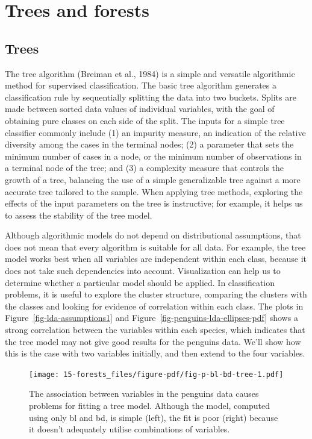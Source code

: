 \documentclass[
  letterpaper,
]{krantz}
\begin{document}
\hypertarget{sec-trees-forests}{%
\chapter{Trees and forests}\label{sec-trees-forests}}

\hypertarget{sec-trees}{%
\section{Trees}\label{sec-trees}}


The tree algorithm (Breiman et al., 1984) is a simple and versatile
algorithmic method for supervised classification. The basic tree
algorithm generates a classification rule by sequentially splitting the
data into two buckets. Splits are made between sorted data values of
individual variables, with the goal of obtaining pure classes on each
side of the split. The inputs for a simple tree classifier commonly
include (1) an impurity measure, an indication of the relative diversity
among the cases in the terminal nodes; (2) a parameter that sets the
minimum number of cases in a node, or the minimum number of observations
in a terminal node of the tree; and (3) a complexity measure that
controls the growth of a tree, balancing the use of a simple
generalizable tree against a more accurate tree tailored to the sample.
When applying tree methods, exploring the effects of the input
parameters on the tree is instructive; for example, it helps us to
assess the stability of the tree model.

Although algorithmic models do not depend on distributional assumptions,
that does not mean that every algorithm is suitable for all data. For
example, the tree model works best when all variables are independent
within each class, because it does not take such dependencies into
account. Visualization can help us to determine whether a particular
model should be applied. In classification problems, it is useful to
explore the cluster structure, comparing the clusters with the classes
and looking for evidence of correlation within each class. The plots in
Figure~\ref{fig-lda-assumptions1} and
Figure~\ref{fig-penguins-lda-ellipses-pdf} shows a strong correlation
between the variables within each species, which indicates that the tree
model may not give good results for the penguins data. We'll show how
this is the case with two variables initially, and then extend to the
four variables.

\begin{figure}

{\centering \texttt{[image: 15-forests\_files/figure-pdf/fig-p-bl-bd-tree-1.pdf]}

}

\caption{\label{fig-p-bl-bd-tree}The association between variables in
the penguins data causes problems for fitting a tree model. Although the
model, computed using only bl and bd, is simple (left), the fit is poor
(right) because it doesn't adequately utilise combinations of
variables.}

\end{figure}
\end{document}
